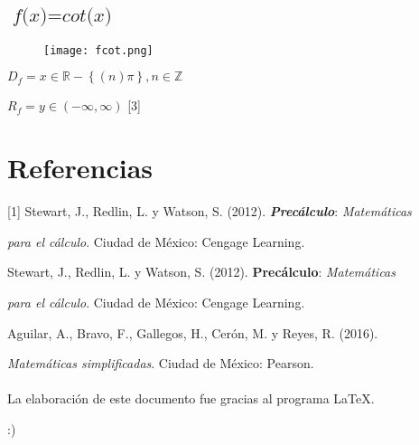 \documentclass[12pt]{article}
\begin{document}
\subsection{$\textit{f(x)} = \textit{cot(x)}$}
\begin{figure}[htb] \centering \texttt{[image: fcot.png]} 
\end{figure}
$D_f = x \in \mathbb{R} - \left\lbrace\left(n\right)\pi\right\rbrace, n \in \mathbb{Z}$ \par
$R_f = y \in \left(-\infty,\infty\right)$ [3]

\newpage

\section{Referencias}

[1] Stewart, J., Redlin, L. y Watson, S. (2012). \textit{\textbf{Precálculo}}: \textit{Matemáticas }\par \textit{para el cálculo}. Ciudad de México: Cengage Learning. \\ 
\par [2] Stewart, J., Redlin, L. y Watson, S. (2012). \textbf{Precálculo}: \textit{Matemáticas} \par \textit{para el cálculo}. Ciudad de México: Cengage Learning. \\
\par [3] Aguilar, A., Bravo, F., Gallegos, H., Cerón, M. y Reyes, R. (2016). \par \textit{Matemáticas simplificadas}. Ciudad de México: Pearson.\\ \\


La elaboración de este documento fue gracias al programa \LaTeX.

:)
\end{document}

